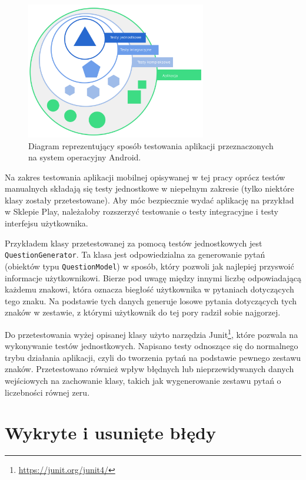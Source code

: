 \documentclass[a4paper,twoside,12pt]{book}
\begin{document}
\begin{figure}[]
\centering
\includegraphics[width=0.7\textwidth]{test-scopes}
\caption{Diagram reprezentujący sposób testowania aplikacji przeznaczonych na system operacyjny Android.}
\label{fig:testscopes}
\end{figure}

Na zakres testowania aplikacji mobilnej opisywanej w tej pracy oprócz testów manualnych składają się testy jednostkowe w niepełnym zakresie (tylko niektóre klasy zostały przetestowane). Aby móc bezpiecznie wydać aplikację na przykład w Sklepie Play, należałoby rozszerzyć testowanie o testy integracyjne i testy interfejsu użytkownika. 

Przykładem klasy przetestowanej za pomocą testów jednostkowych jest \texttt{QuestionGenerator}. Ta klasa jest odpowiedzialna za generowanie pytań (obiektów typu \texttt{QuestionModel}) w sposób, który pozwoli jak najlepiej przyswoić informacje użytkownikowi. Bierze pod uwagę między innymi liczbę odpowiadającą każdemu znakowi, która oznacza biegłość użytkownika w pytaniach dotyczących tego znaku. Na podstawie tych danych generuje losowe pytania dotyczących tych znaków w zestawie, z którymi użytkownik do tej pory radził sobie najgorzej. 

Do przetestowania wyżej opisanej klasy użyto narzędzia Junit\footnote{\url{https://junit.org/junit4/}}, które pozwala na wykonywanie testów jednostkowych. Napisano testy odnoszące się do normalnego trybu działania aplikacji, czyli do tworzenia pytań na podstawie pewnego zestawu znaków. Przetestowano również wpływ błędnych lub nieprzewidywanych danych wejściowych na zachowanie klasy, takich jak wygenerowanie zestawu pytań o liczebności równej zeru. 

\section{Wykryte i usunięte błędy}
\end{document}
